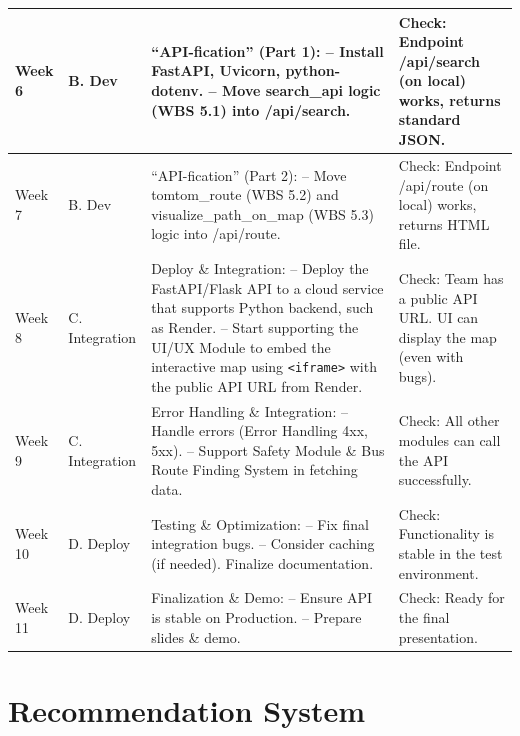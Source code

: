 \begin{longtable}{|>{\raggedright\arraybackslash}p{}|>{\raggedright\arraybackslash}p{}|>{\raggedright\arraybackslash}p{}|>{\raggedright\arraybackslash}p{}|}
\hline
Week 6 & B. Dev & ``API-fication'' (Part 1): \newline\quad -- Install FastAPI, Uvicorn, python-dotenv. \newline\quad -- Move search\_api logic (WBS 5.1) into /api/search. & Check: Endpoint /api/search (on local) works, returns standard JSON. \\
\hline
Week 7 & B. Dev & ``API-fication'' (Part 2): \newline\quad -- Move tomtom\_route (WBS 5.2) and visualize\_path\_on\_map (WBS 5.3) logic into /api/route. & Check: Endpoint /api/route (on local) works, returns HTML file. \\
\hline
Week 8 & C. Integration & Deploy \& Integration: \newline\quad -- Deploy the FastAPI/Flask API to a cloud service that supports Python backend, such as Render. \newline\quad -- Start supporting the UI/UX Module to embed the interactive map using \texttt{<iframe>} with the public API URL from Render. & Check: Team has a public API URL. UI can display the map (even with bugs). \\
\hline
Week 9 & C. Integration & Error Handling \& Integration: \newline\quad -- Handle errors (Error Handling 4xx, 5xx). \newline\quad -- Support Safety Module \& Bus Route Finding System in fetching data. & Check: All other modules can call the API successfully. \\
\hline
Week 10 & D. Deploy & Testing \& Optimization: \newline\quad -- Fix final integration bugs. \newline\quad -- Consider caching (if needed). Finalize documentation. & Check: Functionality is stable in the test environment. \\
\hline
Week 11 & D. Deploy & Finalization \& Demo: \newline\quad -- Ensure API is stable on Production. \newline\quad -- Prepare slides \& demo. & Check: Ready for the final presentation. \\
\hline
\end{longtable}

\section{Recommendation System}
